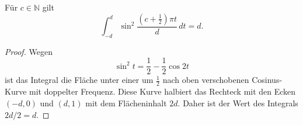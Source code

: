 \begin{lemma}
\label{buch:variation2:legendre:lemma:sin}
Für $c\in\mathbb{N}$ gilt
\[
\int_{-d}^d
\sin^2 \frac{(c+\frac12)\pi t}{d}
\,dt
=
d.
\]
\end{lemma}

\begin{proof}

Wegen
\[
\sin^2 t
=
\frac12 - \frac12\cos 2t
\]
ist das Integral die Fläche unter einer um $\frac12$ nach oben
verschobenen Cosinus-Kurve mit doppelter Frequenz.
Diese Kurve halbiert das Rechteck mit den Ecken $(-d,0)$ und $(d,1)$
mit dem Flächeninhalt $2d$.
Daher ist der Wert des Integrals $2d/2=d$.
\end{proof}

